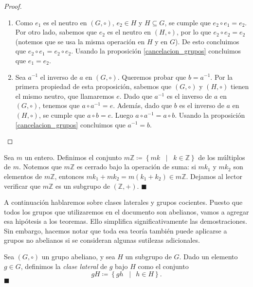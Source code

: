 \begin{proof}
\text{ }
	\begin{enumerate}
	\item 
Como $e_1$ es el neutro en $(G, \circ)$, $e_2\in H$ y $H \subseteq G$, se cumple que $e_2 \circ e_1 = e_2$.
Por otro lado, sabemos que $e_2$ es el neutro en $(H, \circ)$, por lo que $e_2 \circ e_2 = e_2$
(notemos que se usa la misma operación en $H$ y en $G$).
De esto concluimos que $e_2 \circ e_1 = e_2 \circ e_2$. Usando la proposición \ref{cancelacion_grupos} concluimos que $e_1 = e_2$.
	\item 
	Sea $a^{-1}$ el inverso de $a$ en $(G, \circ)$. Queremos probar que $b = a^{-1}$. Por la primera propiedad de esta proposición, sabemos que $(G, \circ)$ y $(H,
\circ)$ tienen el mismo neutro, que llamaremos $e$. 
Dado que $a^{-1}$ es el inverso de $a$ en $(G, \circ)$, tenemos que $a \circ a^{-1} = e$. Además, dado que $b$ es el inverso de $a$ en $(H, \circ)$, se cumple que $a \circ b = e$. Luego $a \circ a^{-1} = a \circ b$. Usando la proposición \ref{cancelacion_grupos} concluimos que $a^{-1} = b$.
	\end{enumerate}
\end{proof}

\begin{example} \label{ejemplo_subgrupo}
Sea $m$ un entero. Definimos el conjunto
$m\mathbb{Z} \coloneq \left\{mk \;\; \mid \;\; k \in \mathbb{Z}\right\}$ de los múltiplos de $m$. Notemos que $m\mathbb{Z}$ es cerrado bajo la operación de suma: si $mk_1$ y $mk_2$ son elementos de $m\mathbb{Z}$, entonces $mk_1 + mk_2 = m(k_1 + k_2) \in m\mathbb{Z}$. Dejamos al lector verificar que $m\mathbb{Z}$ es un subgrupo de $(\mathbb{Z}, +)$. \hfill$\blacksquare$
\end{example}


A continuación hablaremos sobre clases laterales y grupos cocientes. Puesto que todos los grupos que utilizaremos en el documento son abelianos, vamos a agregar esa hipótesis a los teoremas. Ello simplifica significativamente las demostraciones. Sin embargo, hacemos notar que toda esa teoría también puede aplicarse a grupos no abelianos si se consideran algunas sutilezas adicionales. 

\begin{definition} \label{definicion_clase_lateral}
Sea $(G, \circ)$ un grupo abeliano, y sea $H$ un subgrupo de $G$. Dado un elemento $g \in G$, definimos la \emph{clase lateral} de $g$ bajo $H$ como el conjunto
$$g H \coloneq \left\{ gh \;\; \mid \;\, h \in H \right\}.$$ 
\hfill$\blacksquare$
\end{definition}

